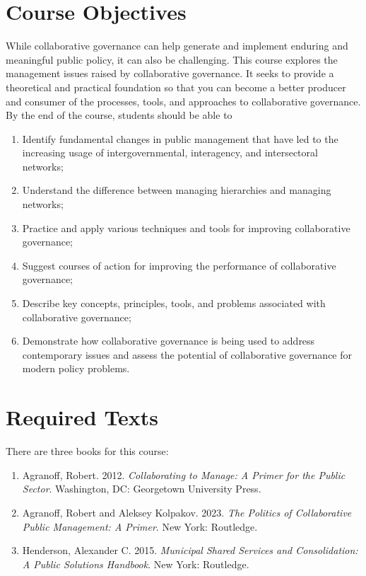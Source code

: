 \documentclass[12pt, letterpaper]{article}
\begin{document}
\section*{Course Objectives}

While collaborative governance can help generate and implement enduring and meaningful public policy, it can also be challenging. This course explores the management issues raised by collaborative governance. It seeks to provide a theoretical and practical foundation so that you can become a better producer and consumer of the processes, tools, and approaches to collaborative governance. By the end of the course, students should be able to

\begin{enumerate}
    \item Identify fundamental changes in public management that have led to the increasing usage of intergovernmental, interagency, and intersectoral networks;
    \item Understand the difference between managing hierarchies and managing networks;
    \item Practice and apply various techniques and tools for improving collaborative governance;
    \item Suggest courses of action for improving the performance of collaborative governance;
    \item Describe key concepts, principles, tools, and problems associated with collaborative governance;
    \item Demonstrate how collaborative governance is being used to address contemporary issues and assess the potential of collaborative governance for modern policy problems. 
\end{enumerate}


\section*{Required Texts}

There are three books for this course:

\begin{enumerate}[leftmargin=!,labelindent=5pt,itemindent=-15pt]
    \item Agranoff, Robert. 2012. \emph{Collaborating to Manage: A Primer for the Public Sector}. Washington, DC: Georgetown University Press. 

    \item Agranoff, Robert and Aleksey Kolpakov. 2023. \emph{The Politics of Collaborative Public Management: A Primer}. New York: Routledge.
    
    \item  Henderson, Alexander C. 2015. \emph{Municipal Shared Services and Consolidation: A Public Solutions Handbook}. New York: Routledge. 
\end{enumerate}
\end{document}
